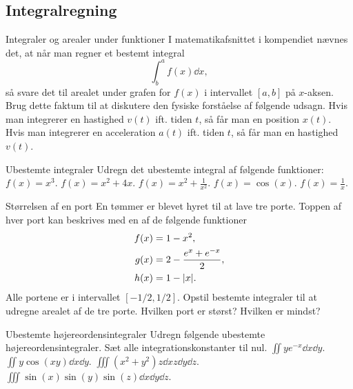\subsection*{Integralregning}
\begin{opgave}{Integraler og arealer under funktioner}
I matematikafsnittet i kompendiet nævnes det, at når man regner et bestemt integral
\begin{equation*}
\int^a_b{f(x)}\dd{x},
\end{equation*}
så svare det til arealet under grafen for $f(x)$ i intervallet $[a,b]$ på $x$-aksen. Brug dette faktum til at diskutere den fysiske forståelse af følgende udsagn.
\opg Hvis man integrerer en hastighed $v(t)$ ift. tiden $t$, så får man en position $x(t)$.
\opg Hvis man integrerer en acceleration $a(t)$ ift. tiden $t$, så får man en hastighed $v(t)$. \\
\end{opgave}
\begin{opgave}{Ubestemte integraler}
	Udregn det ubestemte integral af følgende funktioner:
	\opg $f(x) = x^3$.
	\opg $f(x) = x^2 + 4x$.
	\opg $f(x) = x^2 + \frac{1}{x^2}$.
	\opg $f(x) = \cos (x)$.
	\opg $f(x) = \frac{1}{x}$.
\end{opgave}
\begin{opgave}{Størrelsen af en port}
    En tømmer er blevet hyret til at lave tre porte.
    Toppen af hver port kan beskrives med en af de følgende funktioner
    \begin{align*}
        f(x)&=1-x^2,\\
        g(x)&=2-\frac{e^x+e^{-x}}{2},\\
        h(x) &= 1-\abs{x}.        
    \end{align*}
    Alle portene er i intervallet $[-1/2,1/2]$.
    \opg Opstil bestemte integraler til at udregne arealet af de tre porte.
    \opg Hvilken port er størst?
    \opg Hvilken er mindst?
\end{opgave}
\begin{opgave}{Ubestemte højereordensintegraler}
    Udregn følgende ubestemte højereordensintegraler. Sæt alle integrationskonstanter til nul.
    \opg $\iint ye^{-x}\dd{x}\dd{y}.$
    \opg $\iint y\cos(xy)\dd{x}\dd{y}.$
    \opg $\iiint (x^2+y^2)z\dd{x}z\dd{y}\dd{z}.$
    \opg $\iiint \sin(x)\sin(y)\sin(z)\dd{x}\dd{y}\dd{z}.$
\end{opgave}
